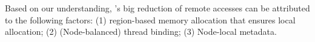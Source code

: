 Based on our understanding, \NM{}'s big reduction of remote accesses can be attributed to the following factors: (1) region-based memory allocation that ensures local allocation; (2) (Node-balanced) thread binding; (3) Node-local metadata. 

